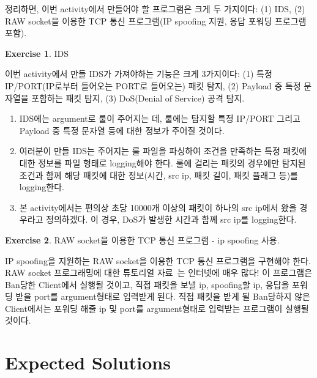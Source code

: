 \documentclass[a4paper, 11pt]{article}
\theoremstyle{definition}
\newtheorem{exercise}{Exercise}
\begin{document}
정리하면, 이번 activity에서 만들어야 할 프로그램은 크게 두 가지이다: (1) IDS, (2) RAW socket을 이용한 TCP 통신 프로그램(IP spoofing 지원, 응답 포워딩 프로그램 포함).

\begin{exercise}

  IDS
  
  이번 activity에서 만들 IDS가 가져야하는 기능은 크게 3가지이다: (1) 특정 IP/PORT(IP로부터 들어오는 PORT로 들어오는) 패킷 탐지, (2) Payload 중 특정 문자열을 포함하는 패킷 탐지, (3) DoS(Denial of Service) 공격 탐지.
  \begin{enumerate}
    \item IDS에는 argument로 룰이 주어지는 데, 룰에는 탐지할 특정 IP/PORT 그리고 Payload 중 특정 문자열 등에 대한 정보가 주어질 것이다.
    \item 여러분이 만들 IDS는 주어지는 룰 파일을 파싱하여 조건을 만족하는 특정 패킷에 대한 정보를 파일 형태로 logging해야 한다. 룰에 걸리는 패킷의 경우에만 탐지된 조건과 함께 해당 패킷에 대한 정보(시간, src ip, 패킷 길이, 패킷 플래그 등)를 logging한다.
    \item 본 activity에서는 편의상 초당 10000개 이상의 패킷이 하나의 src ip에서 왔을 경우라고 정의하겠다. 이 경우, DoS가 발생한 시간과 함께 src ip를 logging한다.
  \end{enumerate}  

\end{exercise}

\begin{exercise}

  RAW socket을 이용한 TCP 통신 프로그램 - ip spoofing 사용.
  
  IP spoofing을 지원하는 RAW socket을 이용한 TCP 통신 프로그램을 구현해야 한다. RAW socket 프로그래밍에 대한 튜토리얼 자료~\cite{rawsocketexample}는 인터넷에 매우 많다! 이 프로그램은 Ban당한 Client에서 실행될 것이고, 직접 패킷을 보낼 ip, spoofing할 ip, 응답을 포워딩 받을 port를 argument형태로 입력받게 된다. 직접 패킷을 받게 될 Ban당하지 않은 Client에서는 포워딩 해줄 ip 및 port를 argument형태로 입력받는 프로그램이 실행될 것이다.

\end{exercise}

\section{Expected Solutions}
\end{document}
